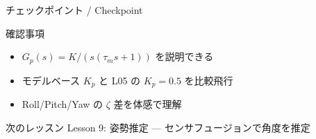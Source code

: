 \documentclass[aspectratio=169, 14pt]{beamer}
\begin{document}
\begin{frame}{チェックポイント / Checkpoint}
  \begin{alertblock}{確認事項}
    \begin{itemize}
      \item[$\square$] $G_p(s) = K / (s(\tau_m s + 1))$ を説明できる
      \item[$\square$] モデルベース $K_p$ と L05 の $K_p=0.5$ を比較飛行
      \item[$\square$] Roll/Pitch/Yaw の $\zeta$ 差を体感で理解
    \end{itemize}
  \end{alertblock}

  \vspace{1em}

  \begin{block}{次のレッスン}
    Lesson 9: 姿勢推定 --- センサフュージョンで角度を推定
  \end{block}
\end{frame}
\end{document}
